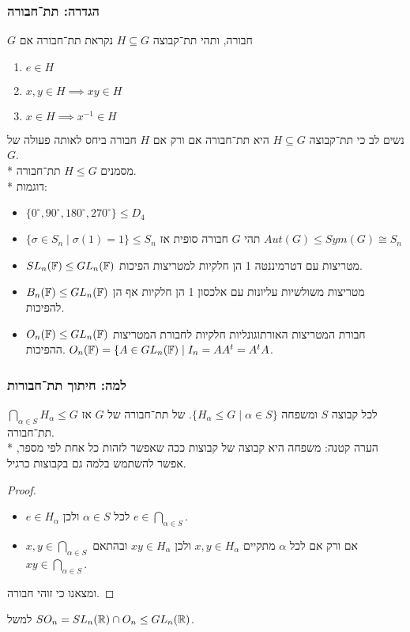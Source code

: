 \subsubsection{הגדרה: תת־חבורה}
$G$ חבורה, ותהי תת־קבוצה $H \subseteq G$ נקראת תת־חבורה אם
\begin{enumerate}
	\item $e \in H$
	\item $x, y \in H \implies xy \in H$
	\item $x \in H \implies x^{-1} \in H$
\end{enumerate}
נשים לב  כי תת־קבוצה $H \subseteq G$ היא תת־חבורה אם ורק אם $H$ חבורה ביחס לאותה פעולה של $G$. \\*
מסמנים $H \le G$ תת־חבורה. \\*
דוגמות:
\begin{itemize}
	\item $\{ 0^\circ, 90^\circ, 180^\circ, 270^\circ \} \le D_4$
	\item $\{ \sigma \in S_n \mid \sigma(1) = 1 \} \le S_n$
		\subitem{-} תהי $G$ חבורה סופית אז $Aut(G) \le Sym(G) \cong S_n$
	\item $SL_n(\mathbb{F}) \le GL_n(\mathbb{F})$ מטריצות עם דטרמיננטה 1 הן חלקיות למטריצות הפיכות.
	\item $B_n(\mathbb{F}) \le GL_n(\mathbb{F})$ מטריצות משולשיות עליונות עם אלכסון 1 הן חלקיות אף הן להפיכות.
	\item $O_n(\mathbb{F}) \le GL_n(\mathbb{F})$ חבורת המטריצות האורתוגונליות חלקיות לחבורת המטריצות ההפיכות. $O_n(\mathbb{F}) = \{ A \in GL_n(\mathbb{F}) \mid I_n = AA^t = A^t A$.
\end{itemize}

\subsubsection{למה: חיתוך תת־חבורות}
לכל קבוצה $S$ ומשפחה $\{ H_\alpha \le G \mid \alpha \in S\}$. של תת־חבורה של $G$ אז $\bigcap_{\alpha \in S} H_\alpha \le G$ תת־חבורה. \\*
הערה קטנה: משפחה היא קבוצה של קבוצות ככה שאפשר לזהות כל אחת לפי מספר, אפשר להשתמש בלמה גם בקבוצות כרגיל.
\begin{proof}
	\begin{itemize}
		\item $e \in H_\alpha$ לכל $\alpha \in S$ ולכן $e \in \bigcap_{\alpha \in S}$.
		\item $x, y \in \bigcap_{\alpha \in S}$ אם ורק אם לכל $\alpha$ מתקיים $x, y \in H_\alpha$ ולכן $xy \in H_\alpha$ ובהתאם $xy \in \bigcap_{\alpha \in S}$.
	\end{itemize}
	ומצאנו כי זוהי חבורה.
\end{proof}
למשל $SO_n = SL_n(\mathbb{R}) \cap O_n \le GL_n(\mathbb{R})$.

